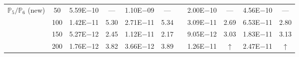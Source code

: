 \begin{table}[H]
{\begin{tabular}{@{}l c c c c c c c c c c@{}}
 \midrule
\multirow{4}{*}{$\mathbb{P}_{5}/\mathbb{P}_{6}$ (new)}
 & 50 & 5.59E$-$10 & ---  & 1.10E$-$09 & --- &  & 2.00E$-$10 & --- & 4.56E$-$10 & ---\\
 & 100 & 1.42E$-$11 & 5.30  & 2.71E$-$11 & 5.34 &  & 3.09E$-$11 & 2.69 & 6.53E$-$11 & 2.80\\
 & 150 & 5.27E$-$12 & 2.45  & 1.12E$-$11 & 2.17 &  & 9.05E$-$12 & 3.03 & 1.83E$-$11 & 3.13\\
 & 200 & 1.76E$-$12 & 3.82  & 3.66E$-$12 & 3.89 &  & 1.26E$-$11 & $\uparrow$ & 2.47E$-$11 & $\uparrow$\\
\bottomrule
\end{tabular}}
\label{none}
\end{table}
